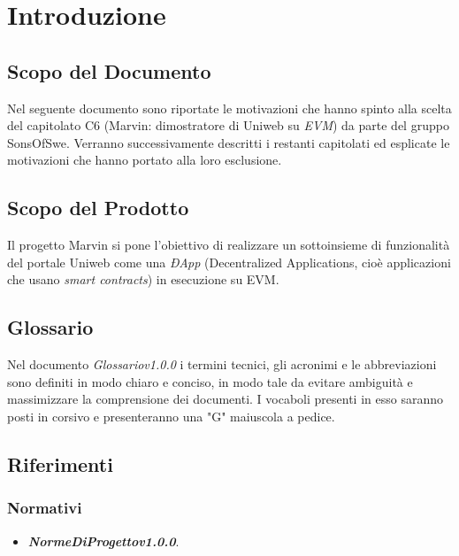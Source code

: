 \section{Introduzione}
\subsection{Scopo del Documento}
	Nel seguente documento sono riportate le motivazioni che hanno spinto alla scelta del capitolato C6 (Marvin: dimostratore di Uniweb su \textit{EVM}) da parte del gruppo SonsOfSwe. Verranno successivamente descritti i restanti capitolati ed esplicate le motivazioni che hanno portato alla loro esclusione.
	
\subsection{Scopo del Prodotto}
	Il progetto Marvin si pone l'obiettivo di realizzare un sottoinsieme di funzionalità del portale Uniweb come una \textit{ÐApp} (Decentralized Applications, cioè applicazioni che usano \textit{smart contracts}) in esecuzione su EVM.
	
\subsection{Glossario}
	Nel documento \textit{Glossario\textunderscore v1.0.0} i termini tecnici, gli acronimi e le abbreviazioni sono definiti in modo chiaro e conciso, in modo tale da evitare ambiguità e massimizzare la comprensione dei documenti.
	\newline \newline I vocaboli presenti in esso saranno posti in corsivo e presenteranno una "G" maiuscola a pedice.
	
\subsection{Riferimenti}
	\subsubsection{Normativi}
		\begin{itemize}
			\item \textbf{\textit{NormeDiProgetto\textunderscore v1.0.0}}.
		\end{itemize}
	
